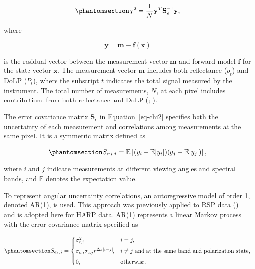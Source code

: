 \documentclass[
  11pt,
  letterpaper,
]{scrreprt}
\begin{document}
\begin{equation}\phantomsection\label{eq-chi2}{
\chi^2
=
\frac{1}{N}
\mathbf{y}^{T}
\mathbf{S}_{\epsilon}^{-1}
\mathbf{y},
}\end{equation}

where

\[
\mathbf{y}
=
\mathbf{m}
-
\mathbf{f}(\mathbf{x})
\]

is the residual vector between the measurement vector \(\mathbf{m}\) and
forward model \(\mathbf{f}\) for the state vector \(\mathbf{x}\). The
measurement vector \(\mathbf{m}\) includes both reflectance (\(\rho_t\))
and DoLP (\(P_t\)), where the subscript \(t\) indicates the total signal
measured by the instrument. The total number of measurements, \(N\), at
each pixel includes contributions from both reflectance and DoLP
(;
).

The error covariance matrix \(\mathbf{S}_{\epsilon}\) in
Equation~\ref{eq-chi2} specifies both the uncertainty of each
measurement and correlations among measurements at the same pixel. It is
a symmetric matrix defined as

\begin{equation}\phantomsection\label{eq-covariance-definition}{
S_{\epsilon;i,j}
=
\mathbb{E}
\left[
(y_i-\mathbb{E}[y_i])
(y_j-\mathbb{E}[y_j])
\right],
}\end{equation}

where \(i\) and \(j\) indicate measurements at different viewing angles
and spectral bands, and \(\mathbb{E}\) denotes the expectation value.

To represent angular uncertainty correlations, an autoregressive model
of order 1, denoted AR(1), is used. This approach was previously applied
to RSP data () and is adopted here for HARP data. AR(1) represents a linear
Markov process with the error covariance matrix specified as

\begin{equation}\phantomsection\label{eq-covariance}{
S_{\epsilon;i,j}
=
\begin{cases}
\sigma_{t,i}^2,
& i=j, \\[4pt]
\sigma_{c,i}\sigma_{c,j}
r^{\Delta_\theta |i-j|},
& i\ne j \text{ and at the same band and polarization state}, \\[4pt]
0,
& \text{otherwise}.
\end{cases}
}\end{equation}
\end{document}
